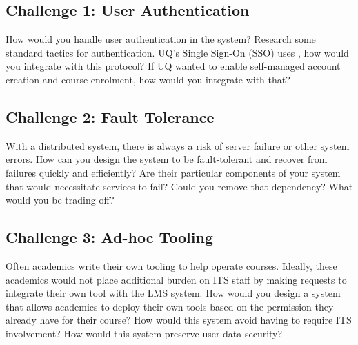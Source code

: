 \documentclass{csse4400}
\begin{document}

\subsection*{Challenge 1: User Authentication}
How would you handle user authentication in the system?
Research some standard tactics for authentication.
UQ's Single Sign-On (SSO) uses ,
how would you integrate with this protocol?
If UQ wanted to enable self-managed account creation and course enrolment,
how would you integrate with that?

\subsection*{Challenge 2: Fault Tolerance}
With a distributed system,
there is always a risk of server failure or other system errors.
How can you design the system to be fault-tolerant and recover from failures quickly and efficiently?
Are their particular components of your system that would necessitate services to fail?
Could you remove that dependency?
What would you be trading off?

\subsection*{Challenge 3: Ad-hoc Tooling}
Often academics write their own tooling to help operate courses.
Ideally, these academics would not place additional burden on ITS staff by making requests to integrate their own tool with the LMS system.
How would you design a system that allows academics to deploy their own tools based on the permission they already have for their course?
How would this system avoid having to require ITS involvement?
How would this system preserve user data security?
\end{document}
